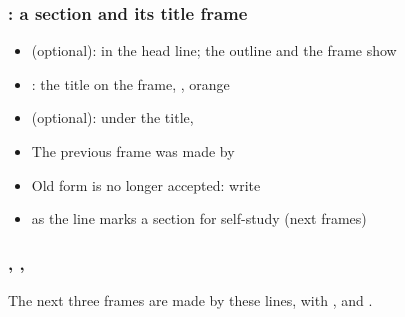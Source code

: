 \documentclass[aspectratio=169,10pt,compress]{beamer}
\begin{document}
\begin{frame}[t,fragile] \frametitle{: a section and its title frame}

\begin{texcode}
\end{texcode}

	\begin{itemize}\small
		\item {} (optional): in the head line; the outline and the frame show 
		\item {}: the title on the frame, , orange
		\item {} (optional): under the title, 
		\item The previous frame was made by
		\item Old form  is no longer accepted:
		write 
		\item {} as the line marks a section for self-study (next frames)
	\end{itemize}
\end{frame}




\begin{frame}[t,fragile] \frametitle{, , }

\begin{texcode}
\end{texcode}

	\small The next three frames are made by these lines, with
	,
	 and
	.
\end{frame}
\end{document}

